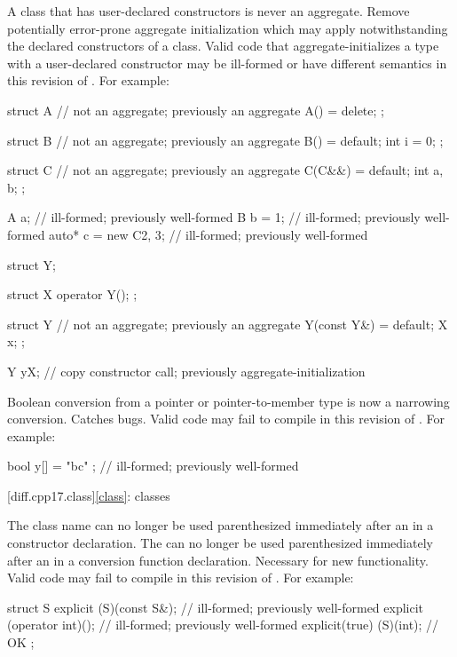 \change
A class that has user-declared constructors is never an aggregate.
\rationale
Remove potentially error-prone aggregate initialization
which may apply notwithstanding the declared constructors of a class.
\effect
Valid \CppXVII{} code that aggregate-initializes
a type with a user-declared constructor
may be ill-formed or have different semantics
in this revision of \Cpp{}.
For example:
\begin{codeblock}
struct A {              // not an aggregate; previously an aggregate
  A() = delete;
};

struct B {              // not an aggregate; previously an aggregate
  B() = default;
  int i = 0;
};

struct C {              // not an aggregate; previously an aggregate
  C(C&&) = default;
  int a, b;
};

A a{};                  // ill-formed; previously well-formed
B b = {1};              // ill-formed; previously well-formed
auto* c = new C{2, 3};  // ill-formed; previously well-formed

struct Y;

struct X {
  operator Y();
};

struct Y {              // not an aggregate; previously an aggregate
  Y(const Y&) = default;
  X x;
};

Y y{X{}};               // copy constructor call; previously aggregate-initialization
\end{codeblock}

\change
Boolean conversion from a pointer or pointer-to-member type
is now a narrowing conversion.
\rationale
Catches bugs.
\effect
Valid \CppXVII{} code may fail to compile
in this revision of \Cpp{}.
For example:
\begin{codeblock}
bool y[] = { "bc" };    // ill-formed; previously well-formed
\end{codeblock}

[diff.cpp17.class]{\ref{class}: classes}

\change
The class name can no longer be used parenthesized
immediately after an  
in a constructor declaration.
The  can no longer be used parenthesized
immediately after an  
in a conversion function declaration.
\rationale
Necessary for new functionality.
\effect
Valid \CppXVII{} code may fail to compile
in this revision of \Cpp{}.
For example:
\begin{codeblock}
struct S {
  explicit (S)(const S&);       // ill-formed; previously well-formed
  explicit (operator int)();    // ill-formed; previously well-formed
  explicit(true) (S)(int);      // OK
};
\end{codeblock}

